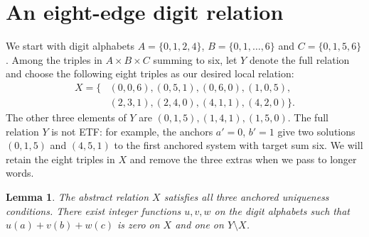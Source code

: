 \documentclass[11pt,a4paper]{article}
\newtheorem{lemma}{Lemma}
\begin{document}
\section{An eight-edge digit relation}
We start with digit alphabets $A=\{0,1,2,4\}$, $B=\{0,1,\ldots,6\}$ and $C=\{0,1,5,6\}$. Among the triples in $A\times B\times C$ summing to six, let $Y$ denote the full relation and choose the following eight triples as our desired local relation:
\[
\begin{aligned}
X=\{&(0,0,6),(0,5,1),(0,6,0),(1,0,5),\\
     &(2,3,1),(2,4,0),(4,1,1),(4,2,0)\}.
\end{aligned}
\]
The other three elements of $Y$ are $(0,1,5),(1,4,1),(1,5,0)$. The full relation $Y$ is not ETF: for example, the anchors $a'=0$, $b'=1$ give two solutions $(0,1,5)$ and $(4,5,1)$ to the first anchored system with target sum six. We will retain the eight triples in $X$ and remove the three extras when we pass to longer words.
\begin{lemma}\label{lem:seed}
The abstract relation $X$ satisfies all three anchored uniqueness conditions. There exist integer functions $u,v,w$ on the digit alphabets such that $u(a)+v(b)+w(c)$ is zero on $X$ and one on $Y\setminus X$.
\end{lemma}
\end{document}
